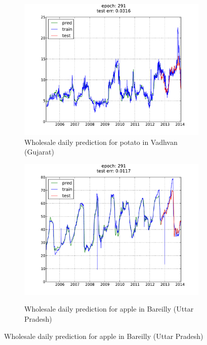 \begin{figure}[H]
    \centering
        \begin{subfigure}[b]{.45\linewidth}
        \centering
        \includegraphics[width=\textwidth]{img/ffnn/1.pdf}
        \caption{Wholesale daily prediction for potato in Vadhvan (Gujarat)}
        \label{subfig:ffnn_pred_1}
        \end{subfigure}
        \quad
        \begin{subfigure}[b]{.45\linewidth}
        \centering
        \includegraphics[width=\textwidth]{img/ffnn/2.pdf}
        \label{subfig:ffnn_pred_2}
        \caption{Wholesale daily prediction for apple in Bareilly (Uttar Pradesh)}
        \end{subfigure}

\end{figure}
